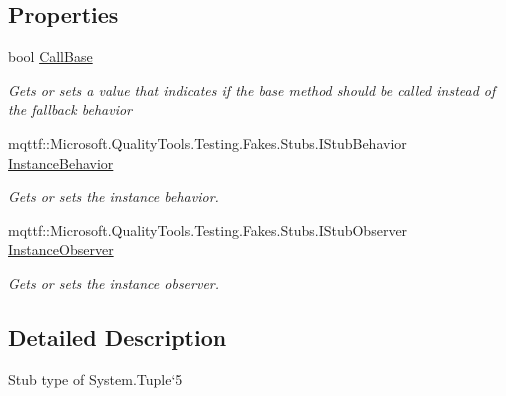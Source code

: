 \subsection*{Properties}
\begin{DoxyCompactItemize}
\item 
bool \hyperlink{class_system_1_1_fakes_1_1_stub_tuple_3_01_t1_00_01_t2_00_01_t3_00_01_t4_00_01_t5_01_4_a8c7a3271369a6a2a8947155f3cfedd61}{Call\-Base}
\begin{DoxyCompactList}\small\item\em Gets or sets a value that indicates if the base method should be called instead of the fallback behavior\end{DoxyCompactList}\item 
mqttf\-::\-Microsoft.\-Quality\-Tools.\-Testing.\-Fakes.\-Stubs.\-I\-Stub\-Behavior \hyperlink{class_system_1_1_fakes_1_1_stub_tuple_3_01_t1_00_01_t2_00_01_t3_00_01_t4_00_01_t5_01_4_ac8753015aeab9d996c611668b12d4bbc}{Instance\-Behavior}
\begin{DoxyCompactList}\small\item\em Gets or sets the instance behavior.\end{DoxyCompactList}\item 
mqttf\-::\-Microsoft.\-Quality\-Tools.\-Testing.\-Fakes.\-Stubs.\-I\-Stub\-Observer \hyperlink{class_system_1_1_fakes_1_1_stub_tuple_3_01_t1_00_01_t2_00_01_t3_00_01_t4_00_01_t5_01_4_a8f4285a16a0c9604f813d9c8ede69731}{Instance\-Observer}
\begin{DoxyCompactList}\small\item\em Gets or sets the instance observer.\end{DoxyCompactList}\end{DoxyCompactItemize}


\subsection{Detailed Description}
Stub type of System.\-Tuple`5



